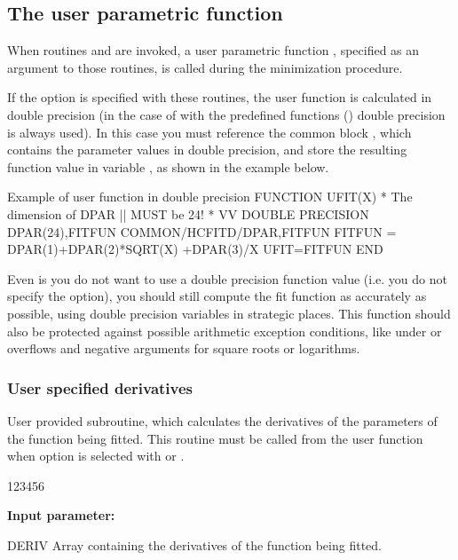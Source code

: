 \subsection{The user parametric function}
\label{sec:userparfun}

When routines  and  are invoked,
a user parametric function , specified as an argument to
those routines, is called during the minimization procedure.

If the  option is specified with these routines,
the user function is calculated in double 
precision (in the case of  with the predefined functions
() double precision is always used).
In this case you must reference the common block ,
%
which contains the parameter values in double precision,
and store the resulting function value in variable ,
as shown in the example below.

\begin{XMPt}{Example of user function in double precision}
      FUNCTION UFIT(X)
*    The dimension of DPAR  ||  MUST be 24!
*                           VV
      DOUBLE PRECISION DPAR(24),FITFUN 
      COMMON/HCFITD/DPAR,FITFUN
      FITFUN = DPAR(1)+DPAR(2)*SQRT(X) +DPAR(3)/X
      UFIT=FITFUN
      END
\end{XMPt}

Even is you do not want to use a double precision
function value (i.e. you do not specify the  option),
you should still compute the fit function as accurately as possible,
using double precision variables in strategic places.
This function should also be protected against possible arithmetic
exception conditions, like under or overflows and
negative arguments for square roots or logarithms.

\subsubsection*{User specified derivatives}

 
\Action
User provided subroutine, which calculates the derivatives of the
parameters of the function being fitted.
This routine must be called from the user function  when 
option  is selected with  or .

\begin{DLtt}{123456}
\item[{\rm\bf Input parameter:}]
\item[DERIV]
Array containing the derivatives of the function being fitted.
\end{DLtt}

